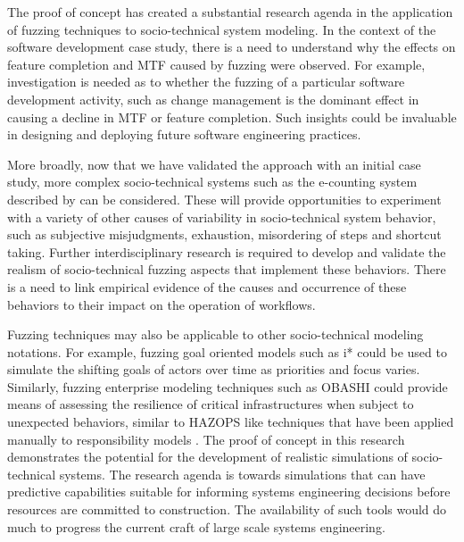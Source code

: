 \documentclass{llncs}
\begin{document}
The proof of concept has created a substantial research agenda in the application of fuzzing techniques to
socio-technical system modeling.  In the context of the software development case study, there is a need to understand
why the effects on feature completion and MTF caused by fuzzing were observed.  For example, investigation is needed as
to whether the fuzzing of a particular software development activity, such as change management is the dominant effect
in causing a decline in MTF or feature completion.  Such insights could be invaluable in designing and deploying future
software engineering practices.

More broadly, now that we have validated the approach with an initial case study, more complex socio-technical systems
such as the e-counting system described by \citet{lock07observations} can be considered.  These will provide
opportunities to experiment with a variety of other causes of variability in socio-technical system behavior, such as
subjective misjudgments, exhaustion, misordering of steps and shortcut taking.  Further interdisciplinary research is
required to develop and validate the realism of socio-technical fuzzing aspects that implement these behaviors. There is
a need to link empirical evidence of the causes and occurrence of these behaviors to their impact on the operation of
workflows.

Fuzzing techniques may also be applicable to other socio-technical modeling notations.  For example, fuzzing goal
oriented models such as i* could be used to simulate the shifting goals of actors over time as priorities and focus
varies.  Similarly, fuzzing enterprise modeling techniques such as OBASHI could provide means of assessing the
resilience of critical infrastructures when subject to unexpected behaviors, similar to HAZOPS like techniques that have
been applied manually to responsibility models \citep{lock09modelling}. The proof of concept in this research demonstrates
the potential for the development of realistic simulations of socio-technical systems. The research agenda is towards
simulations that can have predictive capabilities suitable for informing systems engineering decisions before resources
are committed to construction.  The availability of such tools would do much to progress the current craft of large
scale systems engineering.







\end{document}
